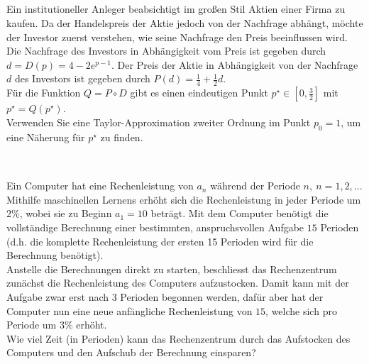 \subsection*{}
Ein institutioneller Anleger beabsichtigt im großen Stil Aktien einer Firma zu kaufen.
Da der Handelspreis der Aktie jedoch von der Nachfrage abhängt, möchte der Investor zuerst verstehen, wie seine Nachfrage den Preis beeinflussen wird.
Die Nachfrage des Investors in Abhängigkeit vom Preis ist gegeben durch $ d = D(p) =4 - 2 e^{p-1}$.
Der Preis der Aktie in Abhängigkeit von der Nachfrage $ d $ des Investors ist gegeben durch $ P(d) = \frac{1}{4} + \frac{1}{2} d $.\\
Für die Funktion $ Q = P \circ D $ gibt es einen eindeutigen Punkt $ p^\star \in \left[0,\frac{3}{2}\right]  $ mit $ p^\star = Q(p^\star) $.\\
Verwenden Sie eine Taylor-Approximation zweiter Ordnung im Punkt $ p_0 = 1 $, um eine Näherung für $ p^\star  $ zu finden.
\\ \\
\subsection*{}
Ein Computer hat eine Rechenleistung von $ a_n $ während der Periode $ n, \ n = 1,2,... $
Mithilfe maschinellen Lernens erhöht sich die Rechenleistung in jeder Periode um $ 2 \%  $, wobei sie zu Beginn $ a_1 = 10 $ beträgt.
Mit dem Computer benötigt die vollständige Berechnung einer bestimmten, anspruchsvollen Aufgabe $ 15 $ Perioden (d.h. die komplette Rechenleistung der ersten 15 Perioden wird für die Berechnung benötigt).\\
Anstelle die Berechnungen direkt zu starten, beschliesst das Rechenzentrum  zunächst die Rechenleistung des Computers aufzustocken.
Damit kann mit der Aufgabe zwar erst nach $ 3 $ Perioden begonnen werden, dafür aber hat der Computer nun eine neue anfängliche Rechenleistung von $ 15 $, welche sich pro Periode um $ 3 \% $ erhöht.\\
Wie viel Zeit (in Perioden) kann das Rechenzentrum durch das Aufstocken des Computers und den Aufschub der Berechnung einsparen?
\\ 
\\
